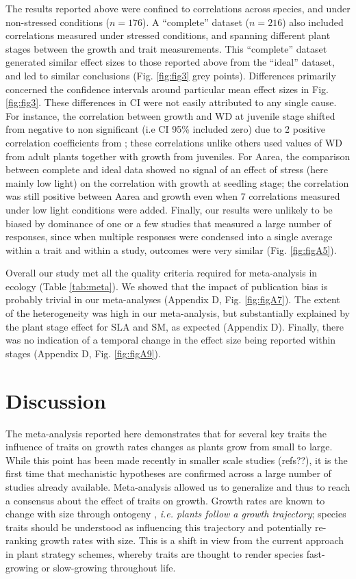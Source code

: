\documentclass[a4paper]{article}\usepackage[]{graphicx}\usepackage[]{color}
\begin{document}
The results reported above were confined to correlations across species, and under non-stressed conditions ($n = 176$). A ``complete'' dataset ($n = 216$) also included correlations measured under stressed conditions, and spanning different plant stages between the growth and trait measurements. This ``complete'' dataset generated similar effect sizes to those reported above from the ``ideal'' dataset, and led to similar conclusions (Fig. \ref{fig:fig3} grey points). Differences primarily concerned the confidence intervals around particular mean effect sizes in Fig. \ref{fig:fig3}. These differences in CI were not easily attributed to any single cause. For instance, the correlation between growth and WD at juvenile stage shifted from negative to non significant (i.e CI 95\% included zero) due to 2 positive correlation coefficients from \citet{Augspurger:1984ct};  these correlations unlike others used values of WD from adult plants together with growth from juveniles. For Aarea, the comparison between complete and ideal data showed no signal of an effect of stress (here mainly low light) on the correlation with growth at seedling stage; the correlation was still positive between Aarea and growth even when 7 correlations measured under low light conditions were added. Finally, our results were unlikely to be biased by dominance of one or a few studies that measured a large number of responses, since when multiple responses were condensed into a single average within a trait and within a study, outcomes were very similar (Fig. \ref{fig:figA5}).

Overall our study met all the quality criteria required for meta-analysis in ecology (Table \ref{tab:meta}). We showed that the impact of publication bias is probably trivial in our meta-analyses (Appendix D, Fig. \ref{fig:figA7}). The extent of the heterogeneity was high in our meta-analysis,  but substantially explained by the plant stage effect for SLA and SM, as expected (Appendix D). Finally, there was no indication of a temporal change in the effect size being reported within stages (Appendix D, Fig. \ref{fig:figA9}).


\section*{Discussion}\label{discussion}

The meta-analysis reported here demonstrates that for several key traits the influence of traits on growth rates changes as plants grow from small to large. While this point has been made recently in smaller scale studies (refs??), it is the first time that mechanistic hypotheses are confirmed across a large number of studies already available. Meta-analysis allowed us to generalize and thus to reach a consensus about the effect of traits on growth. Growth rates are known to change with size through ontogeny \citep{Condit:1993hd, Clark:1999ed, Herault:2011dd}, \textit{i.e. plants follow a growth trajectory}; species traits should be understood as influencing this trajectory and potentially re-ranking growth rates with size. This is a shift in view from the current approach in plant strategy schemes, whereby traits are thought to render species fast-growing or slow-growing throughout life.
\end{document}
